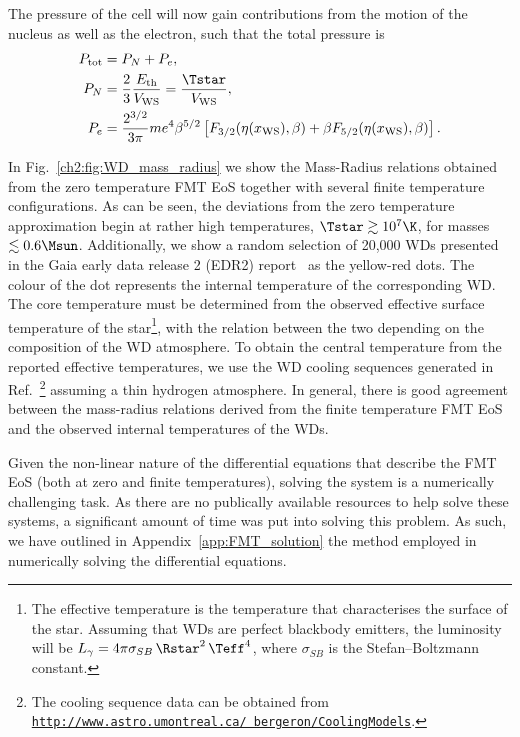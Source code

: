 The pressure of the cell will now gain contributions from the motion of the nucleus as well as the electron, such that the total pressure is
\begin{align}
    P_\mathrm{tot} & = P_N + P_e,\\
    P_N & = \frac{2}{3}\frac{E_\mathrm{th}}{V_\mathrm{WS}} = \frac{\Tstar}{V_\mathrm{WS}},\\
    P_e & = \frac{2^{3/2}}{3\pi} me^4 \beta^{5/2}\left[  F_{3/2}(\eta(x_\mathrm{WS}), \beta) + \beta F_{5/2}(\eta(x_\mathrm{WS}), \beta)  \right].
\end{align}

In Fig.~\ref{ch2:fig:WD_mass_radius} we show the Mass-Radius relations obtained from the zero temperature FMT EoS together with several finite temperature configurations. As can be seen, the deviations from the zero temperature approximation begin at rather high temperatures, $\Tstar\gtrsim 10^7\K$, for masses $\lesssim 0.6 \Msun$. Additionally, we show a random selection of 20,000 WDs presented in the Gaia early data release 2 (EDR2) report~\cite{GentileFusillo_feb_GaiaDataRelease} as the yellow-red dots. The colour of the dot represents the internal temperature of the corresponding WD. The core temperature must be determined from the observed effective surface temperature of the star\footnote{The effective temperature is the temperature that characterises the surface of the star. Assuming that WDs are perfect blackbody emitters, the luminosity will be $L_\gamma = 4\pi \sigma_{SB} \, \Rstar^2 \, \Teff^4$, where $\sigma_{SB}$ is the Stefan–Boltzmann constant.}, with the relation between the two depending on the composition of the WD atmosphere. To obtain the central temperature from the reported effective temperatures, we use the WD cooling sequences generated in Ref.~\cite{Bedard_oct_Spectralevolutionhot}\footnote{The cooling sequence data can be obtained from\\\href{http://www.astro.umontreal.ca/~bergeron/CoolingModels}{\texttt{http://www.astro.umontreal.ca/~bergeron/CoolingModels}}.} assuming a thin hydrogen atmosphere. In general, there is good agreement between the mass-radius relations derived from the finite temperature FMT EoS and the observed internal temperatures of the WDs.

Given the non-linear nature of the differential equations that describe the FMT EoS (both at zero and finite temperatures), solving the system is a numerically challenging task. As there are no publically available resources to help solve these systems, a significant amount of time was put into solving this problem. As such, we have outlined in Appendix~\ref{app:FMT_solution} the method employed in numerically solving the differential equations. 

